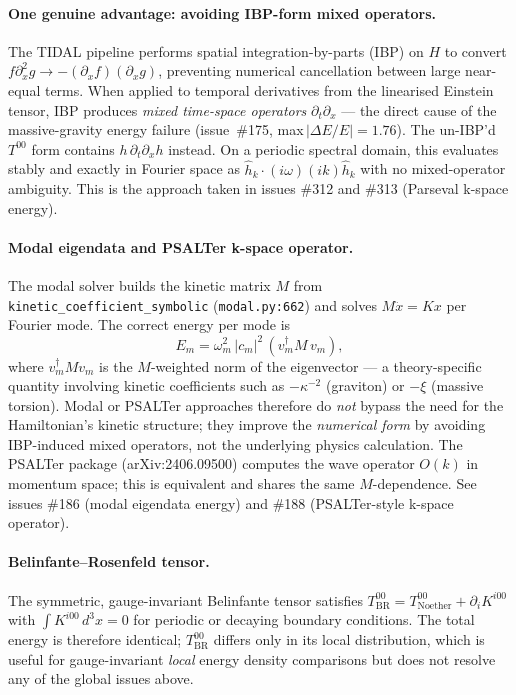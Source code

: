 \paragraph{One genuine advantage: avoiding IBP-form mixed operators.}
The TIDAL pipeline performs spatial integration-by-parts (IBP) on $H$ to convert
$f\partial^2_x g \to -(\partial_x f)(\partial_x g)$, preventing numerical
cancellation between large near-equal terms.  When applied to temporal
derivatives from the linearised Einstein tensor, IBP produces
\emph{mixed time-space operators} $\partial_t\partial_x$ --- the direct cause
of the massive-gravity energy failure (issue~\#175, max\,$|\Delta E/E| = 1.76$).
The un-IBP'd $T^{00}$ form contains $h\,\partial_t\partial_x h$ instead.
On a periodic spectral domain, this evaluates stably and exactly in Fourier space
as $\hat h_k\cdot(i\omega)(ik)\hat h_k$ with no mixed-operator ambiguity.
This is the approach taken in issues \#312 and \#313 (Parseval k-space energy).

\paragraph{Modal eigendata and PSALTer k-space operator.}
The modal solver builds the kinetic matrix $M$ from \texttt{kinetic\_coefficient\_symbolic}
(\texttt{modal.py:662}) and solves $M\ddot x = Kx$ per Fourier mode.  The correct
energy per mode is
\[
  E_m = \omega_m^2\,|c_m|^2\,(v_m^\dagger M\, v_m),
\]
where $v_m^\dagger M v_m$ is the $M$-weighted norm of the eigenvector — a
theory-specific quantity involving kinetic coefficients such as $-\kappa^{-2}$
(graviton) or $-\xi$ (massive torsion).  Modal or PSALTer approaches therefore
do \emph{not} bypass the need for the Hamiltonian's kinetic structure; they
improve the \emph{numerical form} by avoiding IBP-induced mixed operators, not
the underlying physics calculation.  The PSALTer package (arXiv:2406.09500)
computes the wave operator $O(k)$ in momentum space; this is equivalent and
shares the same $M$-dependence.  See issues \#186 (modal eigendata energy)
and \#188 (PSALTer-style k-space operator).

\paragraph{Belinfante--Rosenfeld tensor.}
The symmetric, gauge-invariant Belinfante tensor satisfies
$T^{00}_{\mathrm{BR}} = T^{00}_{\mathrm{Noether}} + \partial_i K^{i00}$ with
$\int K^{i00}\,d^3x = 0$ for periodic or decaying boundary conditions.
The total energy is therefore identical; $T^{00}_{\mathrm{BR}}$ differs only
in its local distribution, which is useful for gauge-invariant \emph{local}
energy density comparisons but does not resolve any of the global issues above.

